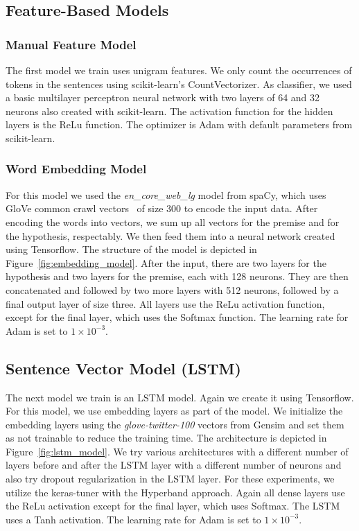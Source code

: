 \documentclass[acmsmall,nonacm]{acmart}
\begin{document}
\subsection{Feature-Based Models}

\subsubsection{Manual Feature Model}
The first model we train uses unigram features. We only count the occurrences of tokens in the sentences using scikit-learn's CountVectorizer. As classifier, we used a basic multilayer perceptron neural network with two layers of 64 and 32 neurons also created with scikit-learn. The activation function for the hidden layers is the ReLu function. The optimizer is Adam with default parameters from scikit-learn. 

\subsubsection{Word Embedding Model} %
For this model we used the \textit{en\_core\_web\_lg} model from spaCy, which uses GloVe common crawl vectors~\cite{glove-pennington2014} of size 300 to encode the input data. After encoding the words into vectors, we sum up all vectors for the premise and for the hypothesis, respectably. We then feed them into a neural network created using Tensorflow. The structure of the model is depicted in Figure~\ref{fig:embedding_model}. After the input, there are two layers for the hypothesis and two layers for the premise, each with 128 neurons. They are then concatenated and followed by two more layers with 512 neurons, followed by a final output layer of size three. All layers use the ReLu activation function, except for the final layer, which uses the Softmax function.  The learning rate for Adam is set to $1\times10^{-3}$.


\subsection{Sentence Vector Model (LSTM)} \label{sec:method_lstm}
The next model we train is an LSTM model. Again we create it using Tensorflow. 
For this model, we use embedding layers as part of the model. We initialize the embedding layers using the \textit{glove-twitter-100} vectors from Gensim and set them as not trainable to reduce the training time. The architecture is depicted in Figure~\ref{fig:lstm_model}.
We try various architectures with a different number of layers before and after the LSTM layer with a different number of neurons and also try dropout regularization in the LSTM layer. For these experiments, we utilize the keras-tuner with the Hyperband approach. Again all dense layers use the ReLu activation except for the final layer, which uses Softmax. The LSTM uses a Tanh activation.  The learning rate for Adam is set to $1\times10^{-3}$.
\end{document}
